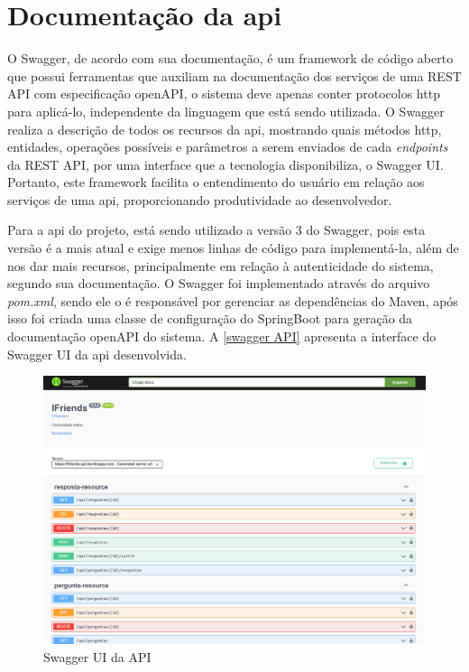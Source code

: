 \section{Documentação da \gls{api}}
O Swagger, de acordo com sua documentação, é um \gls{framework} de código aberto que possui ferramentas que auxiliam na documentação dos serviços de uma \gls{REST API} com especificação \gls{openAPI}, o sistema deve apenas conter protocolos \acs{http} para aplicá-lo, independente da linguagem que está sendo utilizada. O Swagger realiza a descrição de todos os recursos da \acs{api}, mostrando quais métodos \acs{http}, entidades, operações possíveis e parâmetros a serem enviados de cada \textit{\glspl{endpoint}} da \gls{REST API}, por uma interface que a tecnologia disponibiliza, o Swagger UI. Portanto, este \gls{framework} facilita o entendimento do usuário em relação aos serviços de uma \acs{api}, proporcionando produtividade ao desenvolvedor.

Para a \acs{api} do projeto, está sendo utilizado a versão 3 do Swagger, pois esta versão é a mais atual e exige menos linhas de código para implementá-la, além de nos dar mais recursos, principalmente em relação à autenticidade do sistema, segundo sua documentação. O Swagger foi implementado através do arquivo \textit{pom.\acs{xml}}, sendo ele o é responsável por gerenciar as dependências do \gls{Maven}, após isso foi criada uma classe de configuração do \gls{SpringBoot} para geração da documentação \gls{openAPI} do sistema. A \autoref{swagger API} apresenta a interface do Swagger UI da \acs{api} desenvolvida.

\begin{figure}[htb]
\centering
\caption{\label{swagger API} Swagger UI da API}
\includegraphics[width=1\textwidth]{anexos/Imagens_Swagger/API_swagger.png}
\end{figure}
\FloatBarrier

